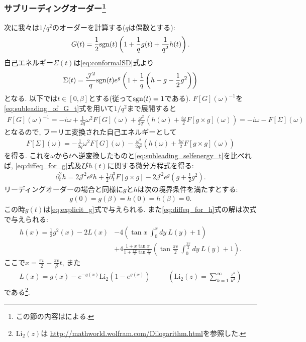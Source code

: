 \subsubsection{サブリーディングオーダー\footnote{この節の内容は\cite{tarnopolsky}による.}}
次に我々は$1/q^2$のオーダーを計算する($q$は偶数とする):
\begin{align}
	G(t) = \frac{1}{2}\mathrm{sgn}(t)\left(1 + \frac{1}{q}g(t) + \frac{1}{q^2}h(t)\right).
	\label{eq:subleading_of_G_t}
\end{align}
自己エネルギー$\Sigma(t)$は\eqref{eq:conformalSD}式より
\begin{align}
	\Sigma(t) = \frac{\mathcal{J}^2}{q}\mathrm{sgn}(t)e^g
		\left(
			1 + \frac{1}{q}\left(h - g - \frac{1}{2}g^2\right)
		\right)
	\label{eq:subleading_selfenergy_t}
\end{align}
となる. 
以下では$t \in [0, \beta]$とする(従って$\mathrm{sgn}(t) = 1$である). 
$F[G](\omega)^{-1}$を\eqref{eq:subleading_of_G_t}式を用いて$1/q^2$まで展開すると
\begin{align}
	F[G](\omega)^{-1} = -i\omega + \frac{1}{2q}\omega^2 F[G](\omega)
		+ \frac{\omega^2}{2q^2}\left(
			h(\omega) + \frac{i\omega}{2}F[g \times g](\omega)
		\right)
		= -i\omega - F[\Sigma](\omega)
\end{align}
となるので, フーリエ変換された自己エネルギーとして
\begin{align}
	F[\Sigma](\omega) = -\frac{1}{2q}\omega^2 F[G](\omega) - \frac{\omega^2}{2q^2}\left(
			h(\omega) + \frac{i\omega}{2}F[g \times g](\omega)
		\right)
\end{align}
を得る. 
これを$\omega$から$t$へ逆変換したものと\eqref{eq:subleading_selfenergy_t}を比べれば, 
\eqref{eq:diffeq_for_g}式及び$h(t)$に関する微分方程式を得る:
\begin{align}
	\partial_t^2 h = 2 \mathcal{J}^2 e^g h + \frac{1}{2}\partial_t^3 F[g \times g]
		- 2\mathcal{J}^2 e^g \left(g + \frac{1}{2}g^2\right)
	\label{eq:diffeq_for_h}.
\end{align}
リーディングオーダーの場合と同様に$g$と$h$は次の境界条件を満たすとする:
\begin{align}
	g(0) = g(\beta) = h(0) = h(\beta) = 0.
\end{align}
この時$g(t)$は\eqref{eq:explicit_g}式で与えられる. 
また\eqref{eq:diffeq_for_h}式の解は次式で与えられる:
\begin{align}
	h(x) = \frac{1}{2}g^2(x) - 2L(x)
		&- 4\left(\tan x\ \int_0^x dy\ L(y) + 1\right)\nonumber\\
		&+ 4\frac{1 + x\tan x}{1 + \frac{\pi v}{2}\tan \frac{\pi v}{2}}\left(
			\tan \frac{\pi v}{2}\ \int_0^{\frac{\pi v}{2}} dy\ L(y) + 1
		\right).
	\label{eq:explicit_h}
\end{align}
ここで$x = \frac{\pi v}{2} - \frac{\pi v}{\beta}t$, 
また
\begin{align}
	L(x) = g(x) - e^{-g(x)}\mathrm{Li}_2(1 - e^{g(x)})
	\hspace{30pt}
	\left(\mathrm{Li}_2(z) = \sum_{k=1}^{\infty}\frac{z^k}{k^2}\right)
\end{align}
である\footnote{$\mathrm{Li}_2(z)$は
\href{http://mathworld.wolfram.com/Dilogarithm.html}{http://mathworld.wolfram.com/Dilogarithm.html}を参照した. }. 

\pagebreak
